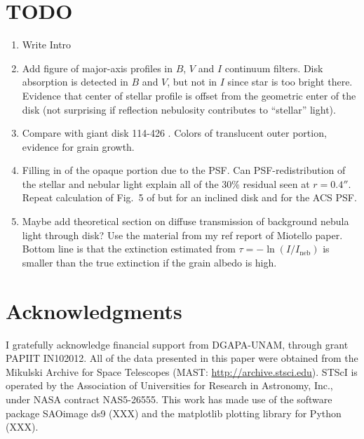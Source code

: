 \documentclass[oneside, 11pt]{article}
\begin{document}
\section*{TODO}
\label{sec:todo}

\begin{enumerate}
\item Write Intro
\item Add figure of major-axis profiles in \(B\), \(V\) and \(I\) continuum filters.  Disk absorption is detected in \(B\) and \(V\), but not in \(I\) since star is too bright there.  Evidence that center of stellar profile is offset from the geometric enter of the disk  (not surprising if reflection nebulosity contributes to ``stellar'' light). 
\item Compare with giant disk 114-426 \citep{2003ApJ...587L.109S, Miotello:2012a}.  Colors of translucent outer portion, evidence for grain growth. 
\item Filling in of the opaque portion due to the PSF.  Can PSF-redistribution of the stellar and nebular light explain all of the 30\% residual seen at \(r = 0.4''\).  Repeat calculation of Fig.~5 of \citeauthor{McCaughrean:1996a} but for an inclined disk and for the ACS PSF. 
\item Maybe add theoretical section on diffuse transmission of background nebula light through disk?   Use the material from my ref report of Miotello paper.  Bottom line is that the extinction estimated from \(\tau = - \ln (I / I_\mathrm{neb}) \) is smaller than the true extinction if the grain albedo is high. 
\end{enumerate}

\section*{Acknowledgments}
\label{sec:ack}
I gratefully acknowledge financial support from DGAPA-UNAM, through grant PAPIIT IN102012.
All of the data presented in this paper were obtained from the Mikulski Archive for Space Telescopes (MAST: \url{http://archive.stsci.edu}).  STScI is operated by the Association of Universities for Research in Astronomy, Inc., under NASA contract NAS5-26555.   This work has made use of the software package SAOimage ds9 (XXX) and the matplotlib plotting library for Python (XXX). 




\end{document}
